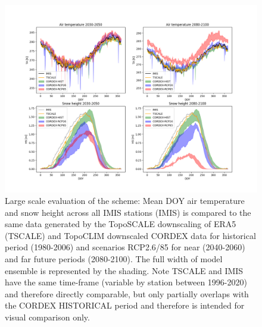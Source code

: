 \documentclass[hess, manuscript]{copernicus}
\begin{document}
\begin{figure}[t]
\includegraphics[width=18cm]{"plots/imis-4panel.png"}
\caption{Large scale evaluation of the scheme: Mean DOY air temperature and snow height across all IMIS stations (IMIS) is compared to the same data generated by the TopoSCALE downscaling of ERA5 (TSCALE) and TopoCLIM downscaled CORDEX data for historical period (1980-2006) and scenarios RCP2.6/85 for near (2040-2060) and far future periods (2080-2100). The full width of model ensemble is represented by the shading. Note TSCALE and IMIS have the same time-frame (variable by station between 1996-2020) and therefore directly comparable, but only partially overlaps with the CORDEX HISTORICAL period and therefore is intended for visual comparison only. }
\end{figure}

\end{document}
